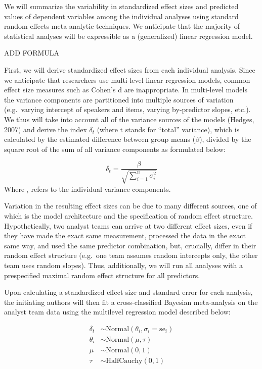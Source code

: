 \documentclass[
  english,
  man]{apa6}
\begin{document}
We will summarize the variability in standardized effect sizes and predicted values of dependent variables among the individual analyses using standard random effects meta-analytic techniques.
We anticipate that the majority of statistical analyses will be expressible as a (generalized) linear regression model.

ADD FORMULA

First, we will derive standardized effect sizes from each individual analysis.
Since we anticipate that researchers use multi-level linear regression models, common effect size measures such as Cohen's d are inappropriate.
In multi-level models the variance components are partitioned into multiple sources of variation (e.g.~varying intercept of speakers and items, varying by-predictor slopes, etc.).
We thus will take into account all of the variance sources of the models (Hedges, 2007) and derive the index \(\delta_t\) (where t stands for \enquote{total} variance), which is calculated by the estimated difference between group means (\(\beta\)), divided by the square root of the sum of all variance components as formulated below:

\[\delta_t = \frac{\beta}{\sqrt{\sum_{i=1}^{n} \sigma^2_{i}}}\]
Where \(_i\) refers to the individual variance components.

Variation in the resulting effect sizes can be due to many different sources, one of which is the model architecture and the specification of random effect structure.
Hypothetically, two analyst teams can arrive at two different effect sizes, even if they have made the exact same measurement, processed the data in the exact same way, and used the same predictor combination, but, crucially, differ in their random effect structure (e.g.~one team assumes random intercepts only, the other team uses random slopes).
Thus, additionally, we will run all analyses with a prespecified maximal random effect structure for all predictors.

Upon calculating a standardized effect size and standard error for each analysis, the initiating authors will then fit a cross-classified Bayesian meta-analysis on the analyst team data using the multilevel regression model described below:

\[
\begin{aligned}
\delta_t & \sim \text{Normal}(\theta_i, \sigma_i = \text{se}_i) \\
\theta_i     & \sim \text{Normal} (\mu, \tau) \\
\mu          & \sim \text{Normal} (0, 1) \\
\tau         & \sim \text{HalfCauchy} (0, 1)
\end{aligned}
\]
\end{document}
